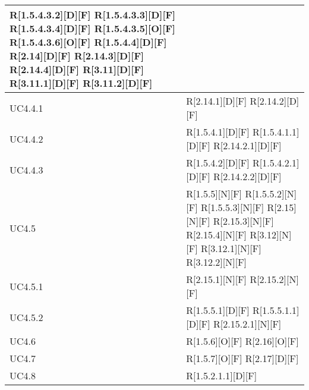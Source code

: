\begin{longtable}{X | X}
R[1.5.4.3.2][D][F] \newline
R[1.5.4.3.3][D][F] \newline
R[1.5.4.3.4][D][F] \newline
R[1.5.4.3.5][O][F] \newline
R[1.5.4.3.6][O][F] \newline
R[1.5.4.4][D][F] \newline
R[2.14][D][F] \newline
R[2.14.3][D][F] \newline
R[2.14.4][D][F] \newline
R[3.11][D][F] \newline
R[3.11.1][D][F] \newline
R[3.11.2][D][F]  \\
\hline
UC4.4.1 & R[2.14.1][D][F] \newline
R[2.14.2][D][F]  \\
\hline
UC4.4.2 & R[1.5.4.1][D][F] \newline
R[1.5.4.1.1][D][F] \newline
R[2.14.2.1][D][F]  \\
\hline
UC4.4.3 & R[1.5.4.2][D][F] \newline
R[1.5.4.2.1][D][F] \newline
R[2.14.2.2][D][F]  \\
\hline
UC4.5 & R[1.5.5][N][F] \newline
R[1.5.5.2][N][F] \newline
R[1.5.5.3][N][F] \newline
R[2.15][N][F] \newline
R[2.15.3][N][F] \newline
R[2.15.4][N][F] \newline
R[3.12][N][F] \newline
R[3.12.1][N][F] \newline
R[3.12.2][N][F]  \\
\hline
UC4.5.1 & R[2.15.1][N][F] \newline
R[2.15.2][N][F]  \\
\hline
UC4.5.2 & R[1.5.5.1][D][F] \newline
R[1.5.5.1.1][D][F] \newline
R[2.15.2.1][N][F]  \\
\hline
UC4.6 & R[1.5.6][O][F] \newline
R[2.16][O][F]  \\
\hline
UC4.7 & R[1.5.7][O][F] \newline
R[2.17][D][F]  \\
\hline
UC4.8 & R[1.5.2.1.1][D][F] \newline

\end{longtable}
